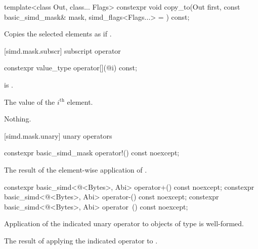 \begin{itemdecl}
template<class Out, class... Flags>
  constexpr void copy_to(Out first, const basic_simd_mask& mask, simd_flags<Flags...> = {}) const;
\end{itemdecl}

\begin{itemdescr}
  \MaskStoreDescr
  {\validMaskedRange}
  {Copies the selected elements as if  \forallmaskedi.}
\end{itemdescr}

[simd.mask.subscr]{ subscript operator}

\begin{itemdecl}
constexpr value_type operator[](@\simdsizetype@ i) const;
\end{itemdecl}

\begin{itemdescr}
  \pnum\expects
   is .

  \pnum\returns
  The value of the $i^\text{th}$ element.

  \pnum\throws Nothing.
\end{itemdescr}

[simd.mask.unary]{ unary operators}

\begin{itemdecl}
constexpr basic_simd_mask operator!() const noexcept;
\end{itemdecl}

\begin{itemdescr}
  \pnum\returns
  The result of the element-wise application of .
\end{itemdescr}

\begin{itemdecl}
constexpr basic_simd<@\integerfrom@<Bytes>, Abi> operator+() const noexcept;
constexpr basic_simd<@\integerfrom@<Bytes>, Abi> operator-() const noexcept;
constexpr basic_simd<@\integerfrom@<Bytes>, Abi> operator~() const noexcept;
\end{itemdecl}

\begin{itemdescr}
  \pnum\constraints
  Application of the indicated unary operator to objects of type  is well-formed.

  \pnum\returns
  The result of applying the indicated operator to .
\end{itemdescr}

